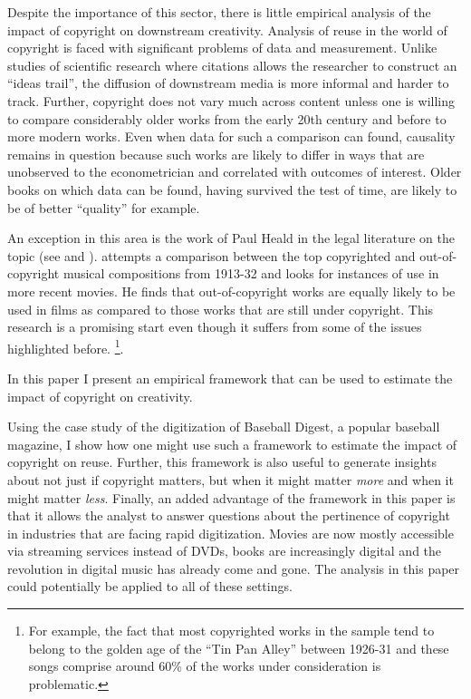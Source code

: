 \documentclass[12pt]{article}
\begin{document}
Despite the importance of this sector, there is little empirical analysis of the impact of copyright on downstream creativity. Analysis of reuse in the world of copyright is faced with significant problems of data and measurement. Unlike studies of scientific research where citations allows the researcher to construct an ``ideas trail'', the diffusion of downstream media is more informal and harder to track. Further, copyright does not vary much across content unless one is willing to compare considerably older works from the early 20th century and before to more modern works. Even when data for such a comparison can found, causality remains in question because such works are likely to differ in ways that are unobserved to the econometrician and correlated with outcomes of interest. Older books on which data can be found, having survived the test of time, are likely to be of better ``quality'' for example. 

An exception in this area is the work of Paul Heald in the legal literature on the topic (see \cite{heald_property_2007} and \cite{heald_testing_2008}). \cite{heald_testing_2008} attempts a comparison between the top copyrighted and out-of-copyright musical compositions from 1913-32 and looks for instances of use in more recent movies. He finds that out-of-copyright works are equally likely to be used in films as compared to those works that are still under copyright. This research is a promising start even though it suffers from some of the issues highlighted before. \footnote{For example, the fact that most copyrighted works in the sample tend to belong to the golden age of the ``Tin Pan Alley'' between 1926-31 and these songs comprise around 60\% of the works under consideration is problematic.}.

In this paper I present an empirical framework that can be used to estimate the impact of copyright on creativity. 





Using the case study of the digitization of Baseball Digest, a popular baseball magazine, I show how one might use such a framework to estimate the impact of copyright on reuse. Further, this framework is also useful to generate insights about not just if copyright matters, but when it might matter \emph{more} and when it might matter \emph{less}. Finally, an added advantage of the framework in this paper is that it allows the analyst to answer questions about the pertinence of copyright in industries that are facing rapid digitization. Movies are now mostly accessible via streaming services instead of DVDs, books are increasingly digital and the revolution in digital music has already come and gone. The analysis in this paper could potentially be applied to all of these settings.
\end{document}

